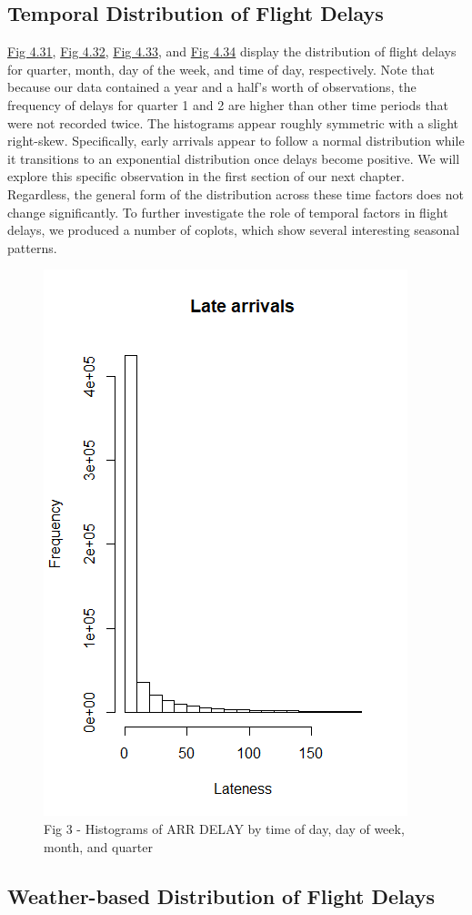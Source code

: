 \documentclass[12pt, a4paper, openany]{book}
\newcommand\tab[1][1cm]{\hspace*{#1}}
\begin{document}
		\subsection{Temporal Distribution of Flight Delays}
		
			\tab \underline{Fig 4.31}, \underline{Fig 4.32}, \underline{Fig 4.33}, and \underline{Fig 4.34} display the distribution of flight delays for quarter, month, day of the week, and time of day, respectively. Note that because our data contained a year and a half’s worth of observations, the frequency of delays for quarter 1 and 2 are higher than other time periods that were not recorded twice. The histograms appear roughly symmetric with a slight right-skew. Specifically, early arrivals appear to follow a normal distribution while it transitions to an exponential distribution once delays become positive. We will explore this specific observation in the first section of our next chapter. Regardless, the general form of the distribution across these time factors does not change significantly. To further investigate the role of temporal factors in flight delays, we produced a number of coplots, which show several interesting seasonal patterns. \\
			\begin{figure}
			\centering
	 		\includegraphics[width = .45 \textwidth]{../figures/LateArrivalsHistogram}
	 		\caption{Fig 3 - Histograms of ARR DELAY by time of day, day of week, month, and quarter}
	 		\end{figure}
	 		
		\subsection{Weather-based Distribution of Flight Delays}
		
\end{document}
